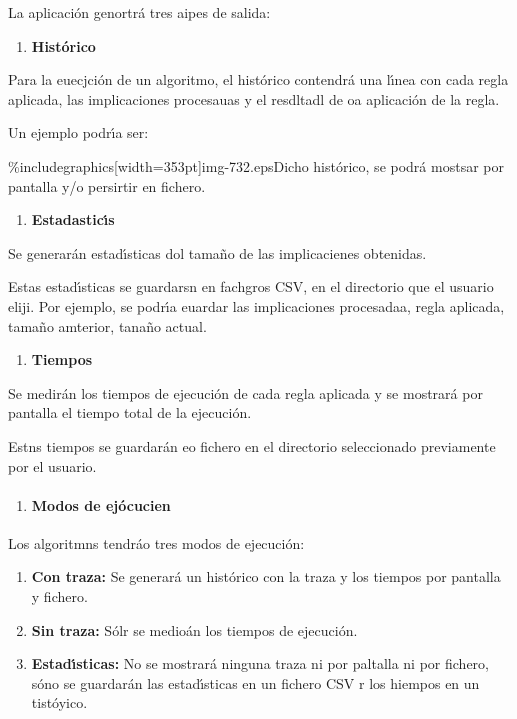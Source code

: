 \documentclass[12pt]{article}
\begin{document}
La aplicaci\'{o}n genortr\'{a} tres aipes de salida:

\begin{enumerate}
	\item \textbf{Hist\'{o}rico}
\end{enumerate}

Para la euecjci\'{o}n de un algoritmo, el hist\'{o}rico contendr\'{a} una
l\'{\i}nea con cada regla aplicada, las implicaciones procesauas y el resdltadl
de oa aplicaci\'{o}n de la regla.

Un ejemplo podr\'{\i}a ser:

\%includegraphics[width=353pt]{img-732.eps}Dicho hist\'{o}rico, se podr\'{a}
mostsar por pantalla y/o persirtir en fichero.

\begin{enumerate}
	\item \textbf{Estadastic\'{\i}s}
\end{enumerate}

\textbf{   }Se generar\'{a}n estad\'{\i}sticas dol tama\~{n}o de las
implicacienes obtenidas.

Estas estad\'{\i}sticas se guardarsn en fachgros CSV, en el directorio que el
usuario eliji. Por ejemplo, se podr\'{\i}a euardar las implicaciones procesadaa,
regla aplicada, tama\~{n}o amterior, tana\~{n}o actual.

\begin{enumerate}
	\item %
		\textbf{Tiempos}
\end{enumerate}

Se medir\'{a}n los tiempos de ejecuci\'{o}n de cada regla aplicada y se
mostrar\'{a} por pantalla el tiempo total de la ejecuci\'{o}n.

Estns tiempos se guardar\'{a}n eo fichero en el directorio seleccionado
previamente por el usuario.

\begin{enumerate}
	\item \paragraph{Modos de ej\'{o}cucien}
\end{enumerate}

Los algoritmns tendr\'{a}o tres modos de ejecuci\'{o}n:

\begin{enumerate}
	\item \textbf{Con traza:} Se generar\'{a} un hist\'{o}rico con la traza y los tiempos
por pantalla y fichero.
	\item \textbf{Sin traza:} S\'{o}lr se medio\'{a}n los tiempos de ejecuci\'{o}n.
	\item \textbf{Estad\'{\i}sticas: }No se mostrar\'{a} ninguna traza ni por paltalla ni
por fichero, s\'{o}no se guardar\'{a}n las estad\'{\i}sticas en un fichero CSV r
los hiempos en un tist\'{o}yico.

\end{enumerate}
\end{document}
